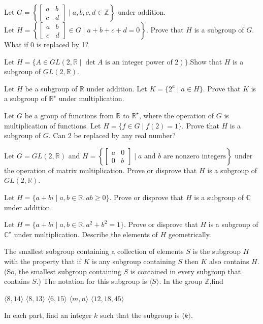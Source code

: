 \documentclass[11pt,largemargins]{homework}
\begin{document}
\question
Let $G=\left\{\begin{bmatrix} a & b \\ c & d \end{bmatrix} \;|\;a,b,c,d \in \mathbb{Z} \right\}$ under addition.\\
Let $H=\left\{\begin{bmatrix} a & b \\ c & d \end{bmatrix} \in G\;|\;a+b+c+d=0 \right\}$. Prove that $H$ is a subgroup of $G$.
What if 0 is replaced by 1?

\question
Let $H=\{A\in GL(2,\mathbb{R} \;|\; \det A\text{ is an integer power of 2})\}$.Show that $H$ is a subgroup of 
$GL(2, \mathbb{R})$.

\question
Let $H$ be a subgroup of $\mathbb{R}$ under addition. Let $K=\{2^a\;|\;a\in H\}$. Prove that $K$ is a subgroup of 
$\mathbb{R}^\star$ under multiplication.

\question
Let $G$ be a group of functions from $\mathbb{R}$ to $\mathbb{R}^\star$, where the operation of $G$ is multiplication 
of functions. Let $H=\{f\in G\;|\; f(2)=1\}$. Prove that $H$ is a subgroup of $G$. Can 2 be replaced by any real number?

\question
Let $G=GL(2,\mathbb{R})$ and $H=\left\{\begin{bmatrix} a & 0 \\ 0 & b \end{bmatrix} \;|\;a\text{ and }b\text{ are 
nonzero integers}\right\}$ under the operation of matrix multiplication. Prove or disprove that $H$ is a subgroup of 
$GL(2,\mathbb{R})$.

\question
Let $H=\{a+bi\;|\; a,b\in\mathbb{R},ab\geq 0\}$. Prove or disprove that $H$ is a subgroup of $\mathbb{C}$ under addition.

\question
Let $H=\{a+bi\;|\; a,b\in\mathbb{R},a^2+b^2=1\}$. Prove or disprove that $H$ is a subgroup of $\mathbb{C}^\star$ under 
multiplication. Describe the elements of $H$ geometrically.

\question
The smallest subgroup containing a collection of elements $S$ is the subgroup $H$ with the property that if $K$ is any subgroup 
containing $S$ then $K$ also contains $H$. (So, the smallest subgroup containing $S$ is contained in every subgroup that 
contains $S$.) The notation for this subgroup is $\langle S \rangle$. In the group $\mathbb{Z}$,find 
\begin{alphaparts}
    \questionpart
    $\langle 8,14 \rangle$
    \questionpart
    $\langle 8,13 \rangle$
    \questionpart
    $\langle 6,15 \rangle$
    \questionpart
    $\langle m,n \rangle$
    \questionpart
    $\langle 12,18,45 \rangle$
\end{alphaparts}
In each part, find an integer $k$ such that the subgroup is $\langle k\rangle$.
\end{document}
